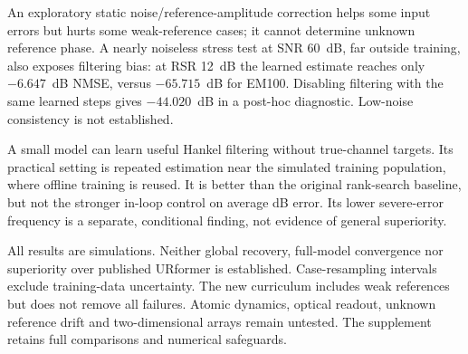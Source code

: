 \documentclass[journal]{IEEEtran}
\begin{document}
An exploratory static noise/reference-amplitude correction helps some
input errors but hurts some weak-reference cases; it cannot determine
unknown reference phase. A nearly noiseless stress test at SNR 60~dB,
far outside training, also exposes filtering bias: at RSR 12~dB the
learned estimate reaches only $-6.647$~dB NMSE, versus $-65.715$~dB for
EM100. Disabling filtering with the same learned steps gives
$-44.020$~dB in a post-hoc diagnostic. Low-noise consistency is not
established.

A small model can learn useful Hankel filtering without true-channel
targets. Its practical setting is repeated estimation near the simulated
training population, where offline training is reused. It is better than
the original rank-search baseline, but not the stronger in-loop control
on average dB error. Its lower severe-error frequency is a separate,
conditional finding, not evidence of general superiority.

All results are simulations. Neither global recovery, full-model
convergence nor superiority over published URformer is established.
Case-resampling intervals exclude training-data uncertainty. The new curriculum
includes weak references but does not remove all failures. Atomic dynamics,
optical readout, unknown reference drift and two-dimensional arrays remain
untested. The supplement retains full comparisons and numerical safeguards.


\end{document}
